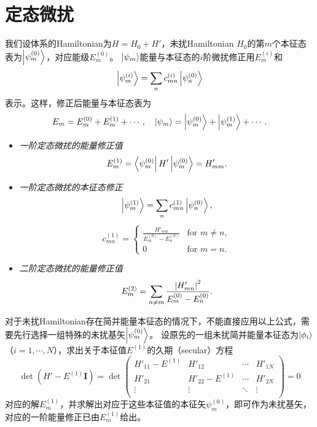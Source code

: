 \section{定态微扰}

我们设体系的Hamiltonian为$H=H_0+H'$，未扰Hamiltonian $H_0$的第$m$个本征态表为$\ket{\psi_m^{(0)}}$，对应能级$E_m^{(0)}$。
$\ket{\psi_m}$能量与本征态的$i$阶微扰修正用$E_m^{(i)}$和
\begin{equation}
    \ket{\psi_m^{(i)}} = \sum_n c_{mn}^{(i)} \ket{\psi_n^{(0)}}
\end{equation}
表示。这样，修正后能量与本征态表为
\begin{equation}
    E_m=E_m^{(0)}+E_m^{(1)}+\cdots, \quad \ket{\psi_m}=\ket{\psi_m^{(0)}}+\ket{\psi_m^{(1)}}+\cdots.
\end{equation}

\begin{itemize}
    \item \emph{一阶定态微扰的能量修正值}
    \begin{equation}
        E_m^{(1)} = \bra{\psi_m^{(0)}}H'\ket{\psi_m^{(0)}} = H'_{mm}.
    \end{equation}
    \item \emph{一阶定态微扰的本征态修正}
    \begin{equation}
        \ket{\psi_m^{(1)}} = \sum_n c_{mn}^{(1)} \ket{\psi_n^{(0)}},
    \end{equation}
    \begin{equation}
        c_{mn}^{(1)} = \begin{cases}
            \frac{H'_{nm}}{E_m^{(0)}-E_n^{(0)}} & \text{for } m \neq n, \\
            0 & \text{for } m = n.
        \end{cases}
    \end{equation}
    \item \emph{二阶定态微扰的能量修正值}
    \begin{equation}
        E_m^{(2)} = \sum_{n\ne m} \frac{\abs{H'_{mn}}^2}{E_m^{(0)}-E_n^{(0)}}.
    \end{equation}
\end{itemize}

对于未扰Hamiltonian存在简并能量本征态的情况下，不能直接应用以上公式，需要先行选择一组特殊的未扰基矢$\ket{\psi_m^{(0)}}$。
设原先的一组未扰简并能量本征态为$\ket{\phi_i}$（$i=1,\cdots,N$），求出关于本征值$E^{(1)}$的久期（secular）方程
\begin{equation}
    \det \left(H' - E^{(1)}\mathbf{I} \right) =
    \det \begin{pmatrix}
        H'_{11}-E^{(1)} & H'_{12} & \cdots & H'_{1N} \\
        H'_{21} & H'_{22}-E^{(1)} & \cdots & H'_{2N} \\
        \vdots & \vdots & \ddots & \vdots \\
    \end{pmatrix} = 0
\end{equation}
对应的解$E_m^{(1)}$，并求解出对应于这些本征值的本征矢$\psi_m^{(0)}$，即可作为未扰基矢，对应的一阶能量修正已由$E_m^{(1)}$给出。
